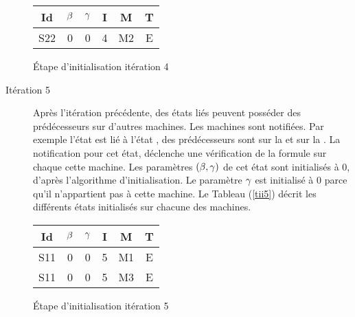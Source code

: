 \begin{Exemple}
\begin{description}
\begin{tableth}
	\centering
	\begin{tabular}{|*{6}{c|}}
		\hline
		Id	& $\beta{}$	&$\gamma{}$&	I&	M&	T\\
		\hline
		S22&	0&	0&	4&	M2&	E\\
		\hline
	\end{tabular}
	\caption{Étape d'initialisation itération 4}\label{tii4}
\end{tableth}
	\item[Itération 5] Après l'itération précédente, des états liés peuvent posséder des prédécesseurs sur d'autres machines. Les machines sont notifiées. Par exemple l'état  est lié à l'état , des prédécesseurs sont  sur la \mone{} et sur la \mtree{}. La notification pour cet état, déclenche une vérification de la formule sur chaque cette machine. Les paramètres $(\beta{}, \gamma{})$ de cet état sont initialisés à $0$, d'après l'algorithme d'initialisation. Le paramètre $\gamma{}$ est initialisé à $0$  parce qu'il n'appartient pas à cette machine. Le Tableau (\ref{tii5}) décrit les différents états initialisés sur chacune des machines.
\begin{tableth}
	\centering
	\begin{tabular}{|*{6}{c|}}
		\hline
		Id	& $\beta{}$	&$\gamma{}$&	I&	M&	T\\
		\hline
		S11&	0&	0&	5&	M1&	E\\
		\hline
		S11&	0&	0&	5&	M3&	E\\
		\hline
	\end{tabular}
	\caption{Étape d'initialisation itération 5}\label{tii5}
\end{tableth}	
\end{description}	
\end{Exemple}

